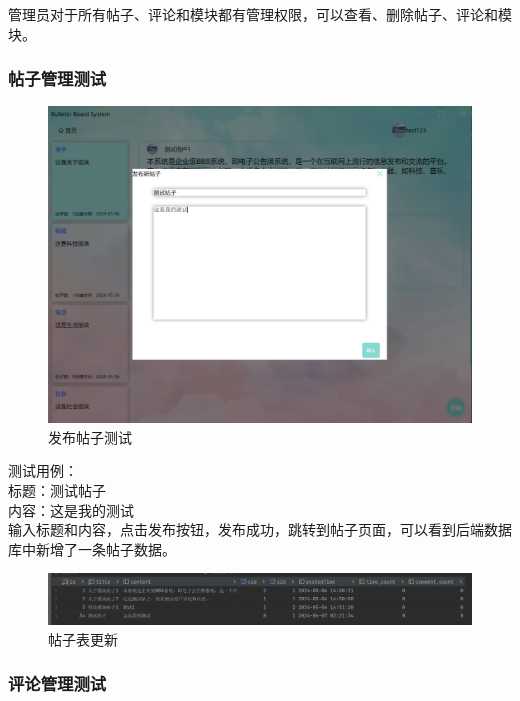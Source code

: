 \documentclass[UTF8]{ctexart}
\begin{document}
管理员对于所有帖子、评论和模块都有管理权限，可以查看、删除帖子、评论和模块。

\subsubsection{帖子管理测试}

\begin{figure}[H]
  \centering
  \includegraphics[scale=0.3]{测试/发帖子.png}
  \caption{发布帖子测试}
\end{figure}

测试用例：\\
标题：测试帖子\\
内容：这是我的测试\\

输入标题和内容，点击发布按钮，发布成功，跳转到帖子页面，可以看到后端数据库中新增了一条帖子数据。

\begin{figure}[H]
  \centering
  \includegraphics[scale=0.3]{测试/帖子表更新.png}
  \caption{帖子表更新}
\end{figure}



\subsubsection{评论管理测试}
\end{document}
